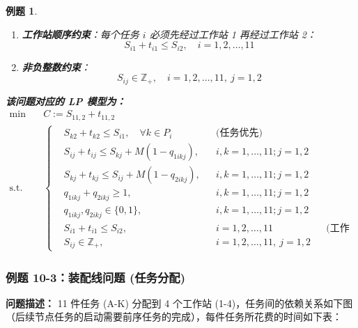 \documentclass[a4paper,12pt]{ctexart} %
\newtheorem{example}{例题}[section]
\begin{document}
\begin{example}
\begin{enumerate}
			\item \textbf{工作站顺序约束}：每个任务 $i$ 必须先经过工作站 1 再经过工作站 2：
			\[
			S_{i1} + t_{i1} \le S_{i2}, \quad i = 1, 2, \dots, 11
			\]
			
			\item \textbf{非负整数约束}：
			\[
			S_{ij} \in \mathbb{Z}_+, \quad i = 1, 2, \dots, 11,\ j = 1, 2
			\]
		\end{enumerate}
		
		\bigskip
		\textbf{该问题对应的 LP 模型为：}
		\[
		\begin{aligned}
			\min \quad & C := S_{11,2} + t_{11,2} \\
			\text{s.t.} \quad & \left\{
			\begin{aligned}
				& S_{k2} + t_{k2} \le S_{i1}, \quad \forall k \in P_i && \text{(任务优先)} \\
				& S_{ij} + t_{ij} \le S_{kj} + M(1 - q_{1ikj}), && i, k = 1, \dots, 11; j = 1, 2 \\
				& S_{kj} + t_{kj} \le S_{ij} + M(1 - q_{2ikj}), && i, k = 1, \dots, 11; j = 1, 2 \\
				& q_{1ikj} + q_{2ikj} \ge 1, && i, k = 1, \dots, 11; j = 1, 2 \\
				& q_{1ikj}, q_{2ikj} \in \{0,1\}, && i, k = 1, \dots, 11; j = 1, 2 \\
				& S_{i1} + t_{i1} \le S_{i2}, && i = 1, 2, \dots, 11 && \text{(工作站顺序)} \\
				& S_{ij} \in \mathbb{Z}_+, && i = 1, 2, \dots, 11,\ j = 1, 2
			\end{aligned}
			\right.
		\end{aligned}
		\]
	\end{example}
	
	\subsubsection{例题 10-3：装配线问题 (任务分配)}
	
	\textbf{问题描述：}
	11 件任务 (A-K) 分配到 4 个工作站 (1-4)，任务间的依赖关系如下图（后续节点任务的启动需要前序任务的完成），每件任务所花费的时间如下表：
	
\end{document}
